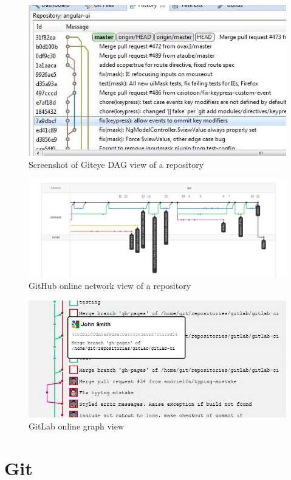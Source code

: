 \begin{figure}[htpb]
  \centering
  \includegraphics[width=0.8\linewidth]{Figures/introduction/giteye_graph.jpg}
  \caption{Screenshot of Giteye DAG view of a repository}
  \label{fig:giteye_screenshot}
\end{figure}

\begin{figure}[htpb]
  \centering
  \includegraphics[width=0.8\linewidth]{Figures/introduction/github_dag.png}
  \caption{GitHub online network view of a repository}
  \label{fig:github_dag_screenshot}
\end{figure}

\begin{figure}[htpb]
  \centering
  \includegraphics[width=0.8\linewidth]{Figures/introduction/gitlab_graph.jpg}
  \caption{GitLab online graph view}
  \label{fig:gitlab_dag_screenshot}
\end{figure}

\section{Git}
\label{sec:git}

